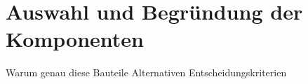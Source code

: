 \section{Auswahl und Begründung der Komponenten} 
Warum genau diese Bauteile
Alternativen
Entscheidungskriterien